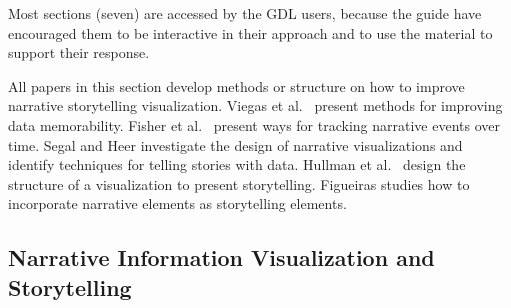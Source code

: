 \documentclass{egpubl}
\begin{document}
Most sections (seven) are accessed by the GDL users, because the guide have encouraged them to be interactive in their approach and to use the material to support their response. 

All papers in this section develop methods or structure on how to improve narrative storytelling visualization. Viegas et al.\ \cite{viegas2004} present methods for improving data memorability. Fisher et al.\ \cite{fisher} present ways for tracking narrative events over time. Segal and Heer \cite{segal} investigate the design of narrative visualizations and identify techniques for telling stories with data. Hullman et al.\ \cite{hullman,hullman2013,hullman2013deeper}
design the structure of a visualization to present storytelling.  Figueiras \cite{figueiras,figueiras2014tell} studies how to incorporate narrative elements as storytelling elements.

\subsection{Narrative Information Visualization and Storytelling}
\end{document}
